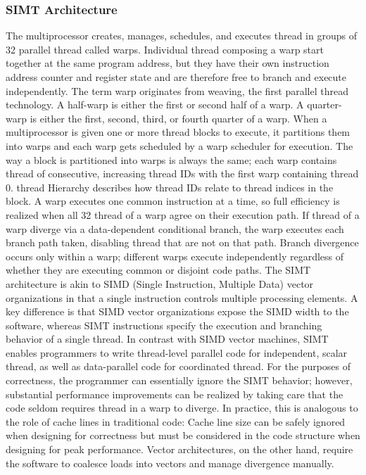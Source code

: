 \documentclass[openany]{book}
\begin{document}
\subsubsection{SIMT Architecture}%
The multiprocessor creates, manages, schedules, and executes 
thread in groups of 32 parallel thread called 
warps. Individual thread composing a warp start together at the 
same program address, but they have their own instruction address counter and 
register state and are therefore free to branch and execute independently. The 
term warp originates from weaving, the first parallel thread 
technology. A half-warp is either the first or second half of a warp. A 
quarter-warp is either the first, second, third, or fourth quarter of a warp.
When a multiprocessor is given one or more thread blocks to 
execute, it partitions them into warps and each warp gets scheduled by a warp 
scheduler for execution. The way a block is partitioned into warps is always 
the same; each warp contains thread of consecutive, increasing 
thread IDs with the first warp containing thread 
0. thread Hierarchy describes how thread IDs 
relate to thread indices in the block.
A warp executes one common instruction at a time, so full efficiency is 
realized when all 32 thread of a warp agree on their execution 
path. If thread of a warp diverge via a data-dependent 
conditional branch, the warp executes each branch path taken, disabling 
thread that are not on that path. Branch divergence occurs only 
within a warp; different warps execute independently regardless of whether 
they are executing common or disjoint code paths.
The SIMT architecture is akin to SIMD (Single Instruction, Multiple Data) 
vector organizations in that a single instruction controls multiple processing 
elements. A key difference is that SIMD vector organizations expose the SIMD 
width to the software, whereas SIMT instructions specify the execution and 
branching behavior of a single thread. In contrast with SIMD 
vector machines, SIMT enables programmers to write thread-level 
parallel code for independent, scalar thread, as well as 
data-parallel code for coordinated thread. For the purposes of 
correctness, the programmer can essentially ignore the SIMT behavior; however, 
substantial performance improvements can be realized by taking care that the 
code seldom requires thread in a warp to diverge. In practice, 
this is analogous to the role of cache lines in traditional code: Cache line 
size can be safely ignored when designing for correctness but must be 
considered in the code structure when designing for peak performance. Vector 
architectures, on the other hand, require the software to coalesce loads 
into vectors and manage divergence manually.
\end{document}
